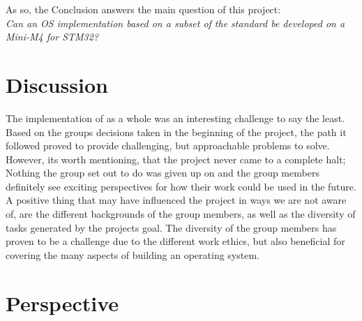 As so, the Conclusion answers the main question of this project:\\
\textit{Can an OS implementation based on a subset of the \arinc{} standard be
developed on a Mini-M4 for STM32?}
\clearpage

\section{Discussion}
\iffalse
The main concerns presented by the forums communities were the security levels of the implementation of
this OS. The two main topics were: how to identify an error and how to track it to the origin and how the
system will react to different levels of failure, from small to fatal errors. If the entire system would
reboot, only restart the partition or block it.\\
Other problems suggested were related to the interrupts, when context switching if the next partition
would also have access to all them, and how the control is made to prevent any errors related.\\
The idea of an OpenSource implementation like this was well accepted due to the lack of examples avaiable.
It was given an example of an implementation in the USA, of a similar system and that is still used for
communication infrastructures.
The whole text is presented in the \nameref{chap:Forum Responces}.
\todo{can't make the refrence work, help!}
\fi

The implementation of \OSname{} as a whole was an interesting challenge
to say the least. Based on the group\textquotesingle s decisions taken in the beginning 
of the project, the path it followed proved to provide challenging, but
approachable problems to solve. However, its worth mentioning,
that the project never came to a complete halt;
Nothing the group set out to do was given up on and the group
members definitely see exciting perspectives for how their work could be
used in the future.\\
A positive thing that may have influenced the project in ways we are
not aware of, are the different backgrounds of the group members, as well as
the diversity of tasks generated by the project\textquotesingle s goal.
The diversity of the group members has proven to be a challenge due to the different work ethics,
but also beneficial for covering the many aspects of building an operating system.


\section{Perspective}
